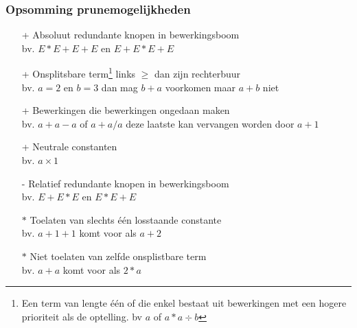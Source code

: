 \documentclass[Main.tex]{subfiles}
\begin{document}
\subsubsection*{Opsomming prunemogelijkheden}
\begin{itemize}
\item[+] Absoluut redundante knopen in bewerkingsboom\\
bv. $E \ast E+E+E$ en $E+E \ast E+E$
\item[+] Onsplitsbare term\footnote{\label{note:onsplitsbaar}Een term van lengte \'e\'en of die enkel bestaat uit bewerkingen met een hogere prioriteit als de optelling. bv $a$ of $a \ast a \div b$}
links $\geq$ dan zijn rechterbuur\\
	bv. $a=2$ en $b=3$ dan mag $b+a$ voorkomen maar $a+b$ niet
\item[+] Bewerkingen die bewerkingen ongedaan maken\\
	bv. $a+a-a$ of $a+a/a$ deze laatste kan vervangen worden door $a+1$
\item[+] Neutrale constanten\\
	bv. $a \times 1$
\item[-] Relatief redundante knopen in bewerkingsboom\\
	bv. $E+E \ast E$ en $E \ast E+E$
\item[$\ast$] Toelaten van slechts één losstaande constante \\
	bv. $a+1+1$ komt voor als $a+2$
\item[$\ast$] Niet toelaten van zelfde onsplistbare term\footnotemark[\ref{note:onsplitsbaar}]\\
	bv. $a+a$ komt voor als $2 \ast a$
\end{itemize}
\end{document}
